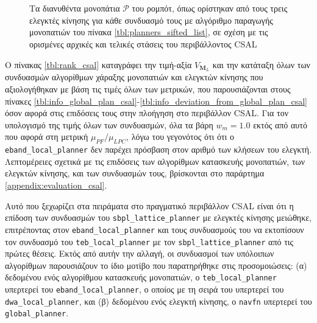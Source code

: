 \begin{figure*}\centering
  \begin{subfigure}[t]{\linewidth}
    \centering
    
  \end{subfigure}\\%
  \vspace{-1.5cm}
  \begin{subfigure}[t]{\linewidth}
    \centering
    
  \end{subfigure}\\%
  \vspace{-1.5cm}
  \begin{subfigure}[t]{\linewidth}
    \centering
    
  \end{subfigure}%
  \caption{\small Τα διανυθέντα μονοπάτια $\bm{\mathcal{P}}$ του ρομπότ, όπως
           ορίστηκαν από τους τρεις ελεγκτές κίνησης για κάθε συνδυασμό τους με
           αλγόριθμο παραγωγής μονοπατιών του πίνακα
           \ref{tbl:planners_sifted_list}, σε σχέση με τις ορισμένες αρχικές και
           τελικές στάσεις του περιβάλλοντος CSAL}
  \label{fig:poses:csal}
\end{figure*}

Ο πίνακας \ref{tbl:rank_csal} καταγράφει την τιμή-αξία $V_{\bm{M}_L}$
και την κατάταξη όλων των συνδυασμών αλγορίθμων χάραξης μονοπατιών και
ελεγκτών κίνησης που αξιολογήθηκαν με βάση τις τιμές όλων των μετρικών, που
παρουσιάζονται στους πίνακες
\ref{tbl:info_global_plan_csal}-\ref{tbl:info_deviation_from_global_plan_csal}
όσον αφορά στις επιδόσεις τους στην πλοήγηση στο περιβάλλον CSAL. Για τον
υπολογισμό της τιμής όλων των συνδυασμών, όλα τα βάρη $w_m = 1.0$ εκτός από
αυτό που αφορά στη μετρική $\mu_{PF} / \mu_{LPC}$, λόγω του γεγονότος ότι ότι ο
\texttt{eband\_local\_planner} δεν παρέχει πρόσβαση στον αριθμό των κλήσεων του
ελεγκτή. Λεπτομέρειες σχετικά με τις επιδόσεις των αλγορίθμων κατασκευής
μονοπατιών, των ελεγκτών κίνησης, και των συνδυασμών τους, βρίσκονται στο
παράρτημα \ref{appendix:evaluation_csal}.

Αυτό που ξεχωρίζει στα πειράματα στο πραγματικό περιβάλλον CSAL είναι ότι η
επίδοση των συνδυασμών του \texttt{sbpl\_lattice\_planner} με ελεγκτές κίνησης
μειώθηκε, επιτρέποντας στον \texttt{eband\_local\_planner} και τους συνδυασμούς
του να εκτοπίσουν τον συνδυασμό του \texttt{teb\_local\_planner} με τον
\texttt{sbpl\_lattice\_planner} από τις πρώτες θέσεις. Εκτός από αυτήν την
αλλαγή, οι συνδυασμοί των υπόλοιπων αλγορίθμων παρουσιάζουν το ίδιο μοτίβο που
παρατηρήθηκε στις προσομοιώσεις: (α) δεδομένου ενός αλγορίθμου κατασκευής
μονοπατιών, ο \texttt{teb\_local\_planner} υπερτερεί του
\texttt{eband\_local\_planner}, ο οποίος με τη σειρά του υπερτερεί του
\texttt{dwa\_local\_planner}, και (β) δεδομένου ενός ελεγκτή κίνησης, ο
\texttt{navfn} υπερτερεί του \texttt{global\_planner}.



